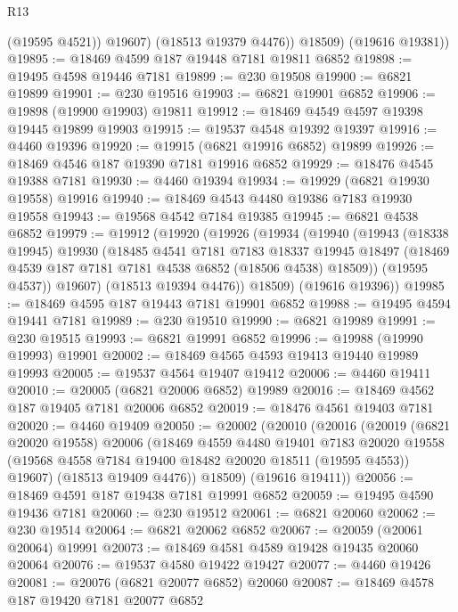 \begin{lexlean}{R13}
\begin{coremodule}
              (@19595 @4521))
            @19607)
          (@18513 @19379 @4476))
        @18509)
      (@19616 @19381))
@19895 := @18469 @4599 @187 @19448 @7181 @19811 @6852
@19898 := @19495 @4598 @19446 @7181
@19899 := @230 @19508
@19900 := @6821 @19899
@19901 := @230 @19516
@19903 := @6821 @19901 @6852
@19906 := @19898 (@19900 @19903) @19811
@19912 := @18469 @4549 @4597 @19398 @19445 @19899 @19903
@19915 := @19537 @4548 @19392 @19397
@19916 := @4460 @19396
@19920 := @19915 (@6821 @19916 @6852) @19899
@19926 := @18469 @4546 @187 @19390 @7181 @19916 @6852
@19929 := @18476 @4545 @19388 @7181
@19930 := @4460 @19394
@19934 := @19929 (@6821 @19930 @19558) @19916
@19940 := @18469 @4543 @4480 @19386 @7183 @19930 @19558
@19943 := @19568 @4542 @7184 @19385
@19945 := @6821 @4538 @6852
@19979 := @19912
    (@19920
      (@19926
        (@19934
          (@19940
            (@19943
              (@18338 @19945)
              @19930
              (@18485
                @4541
                @7181
                @7183
                @18337
                @19945
                @18497
                (@18469 @4539 @187 @7181 @7181 @4538 @6852 (@18506 @4538) @18509))
              (@19595 @4537))
            @19607)
          (@18513 @19394 @4476))
        @18509)
      (@19616 @19396))
@19985 := @18469 @4595 @187 @19443 @7181 @19901 @6852
@19988 := @19495 @4594 @19441 @7181
@19989 := @230 @19510
@19990 := @6821 @19989
@19991 := @230 @19515
@19993 := @6821 @19991 @6852
@19996 := @19988 (@19990 @19993) @19901
@20002 := @18469 @4565 @4593 @19413 @19440 @19989 @19993
@20005 := @19537 @4564 @19407 @19412
@20006 := @4460 @19411
@20010 := @20005 (@6821 @20006 @6852) @19989
@20016 := @18469 @4562 @187 @19405 @7181 @20006 @6852
@20019 := @18476 @4561 @19403 @7181
@20020 := @4460 @19409
@20050 := @20002
    (@20010
      (@20016
        (@20019
          (@6821 @20020 @19558)
          @20006
          (@18469
            @4559
            @4480
            @19401
            @7183
            @20020
            @19558
            (@19568 @4558 @7184 @19400 @18482 @20020 @18511 (@19595 @4553))
            @19607)
          (@18513 @19409 @4476))
        @18509)
      (@19616 @19411))
@20056 := @18469 @4591 @187 @19438 @7181 @19991 @6852
@20059 := @19495 @4590 @19436 @7181
@20060 := @230 @19512
@20061 := @6821 @20060
@20062 := @230 @19514
@20064 := @6821 @20062 @6852
@20067 := @20059 (@20061 @20064) @19991
@20073 := @18469 @4581 @4589 @19428 @19435 @20060 @20064
@20076 := @19537 @4580 @19422 @19427
@20077 := @4460 @19426
@20081 := @20076 (@6821 @20077 @6852) @20060
@20087 := @18469 @4578 @187 @19420 @7181 @20077 @6852

\end{coremodule}
\end{lexlean}
